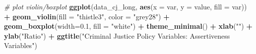 \documentclass[]{article}
\newenvironment{Shaded}{\begin{snugshade}}{\end{snugshade}}
\newcommand{\CommentTok}[1]{\textcolor[rgb]{0.56,0.35,0.01}{\textit{#1}}}
\newcommand{\DataTypeTok}[1]{\textcolor[rgb]{0.13,0.29,0.53}{#1}}
\newcommand{\FloatTok}[1]{\textcolor[rgb]{0.00,0.00,0.81}{#1}}
\newcommand{\KeywordTok}[1]{\textcolor[rgb]{0.13,0.29,0.53}{\textbf{#1}}}
\newcommand{\NormalTok}[1]{#1}
\newcommand{\OperatorTok}[1]{\textcolor[rgb]{0.81,0.36,0.00}{\textbf{#1}}}
\newcommand{\StringTok}[1]{\textcolor[rgb]{0.31,0.60,0.02}{#1}}
\begin{document}
\begin{Shaded}
\end{Shaded}

\begin{Shaded}
\begin{Highlighting}[]
\CommentTok{# plot violin/boxplot }
\KeywordTok{ggplot}\NormalTok{(data_cj_long, }\KeywordTok{aes}\NormalTok{(}\DataTypeTok{x =}\NormalTok{ var, }\DataTypeTok{y =}\NormalTok{ value, }\DataTypeTok{fill =}\NormalTok{ var)) }\OperatorTok{+}
\StringTok{  }\KeywordTok{geom_violin}\NormalTok{(}\DataTypeTok{fill =} \StringTok{"thistle3"}\NormalTok{, }\DataTypeTok{color =} \StringTok{"grey28"}\NormalTok{) }\OperatorTok{+}\StringTok{ }
\StringTok{  }\KeywordTok{geom_boxplot}\NormalTok{(}\DataTypeTok{width=}\FloatTok{0.1}\NormalTok{, }\DataTypeTok{fill =} \StringTok{"white"}\NormalTok{) }\OperatorTok{+}\StringTok{ }
\StringTok{  }\KeywordTok{theme_minimal}\NormalTok{() }\OperatorTok{+}
\StringTok{  }\KeywordTok{xlab}\NormalTok{(}\StringTok{""}\NormalTok{) }\OperatorTok{+}
\StringTok{  }\KeywordTok{ylab}\NormalTok{(}\StringTok{"Ratio"}\NormalTok{) }\OperatorTok{+}\StringTok{ }
\StringTok{  }\KeywordTok{ggtitle}\NormalTok{(}\StringTok{"Criminal Justice Policy Variables: Assertiveness Variables"}\NormalTok{)}
\end{Highlighting}
\end{Shaded}
\end{document}
